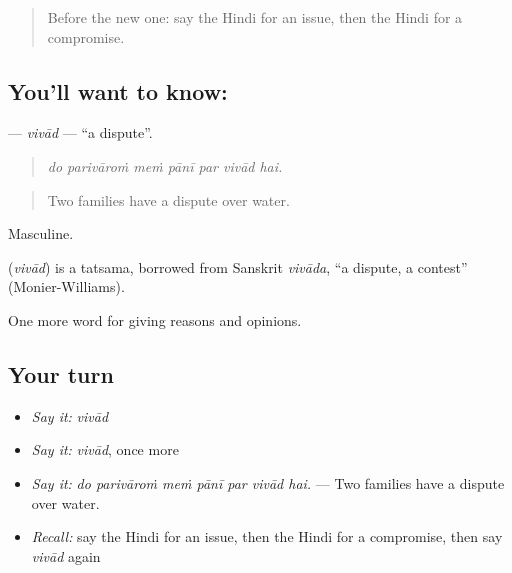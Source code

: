 \label{lesson:HI-C359-vivad}



\begin{quote}
Before the new one: say the Hindi for an issue, then the Hindi for a compromise.
\end{quote}

\subsection*{You'll want to know: }
\textbf{} — \emph{vivād} — \textquotedblleft{}a dispute\textquotedblright{}.

\begin{quote}
      
\end{quote}

\begin{quote}
\emph{do parivāroṁ meṁ pānī par vivād hai.}
\end{quote}

\begin{quote}
Two families have a dispute over water.
\end{quote}

Masculine.

\begin{cousinweb}
\textbf{} (\emph{vivād}) is a tatsama, borrowed from Sanskrit \emph{vivāda}, \textquotedblleft{}a dispute, a contest\textquotedblright{} (Monier-Williams).
\end{cousinweb}

\begin{grammarlens}[title={What you've built}]
One more word for giving reasons and opinions.
\end{grammarlens}

\subsection*{Your turn}
\begin{itemize}
\raggedright
  \item \emph{Say it:} \emph{vivād}
  \item \emph{Say it:} \emph{vivād}, once more
  \item \emph{Say it:} \emph{do parivāroṁ meṁ pānī par vivād hai.} — Two families have a dispute over water.
  \item \emph{Recall:} say the Hindi for an issue, then the Hindi for a compromise, then say \emph{vivād} again
\end{itemize}

